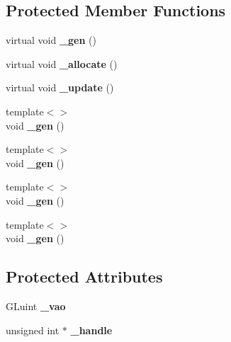 \subsection*{\-Protected \-Member \-Functions}
\begin{DoxyCompactItemize}
\item 
\hypertarget{classs9_1_1gl_1_1Asset_ad03fd53ceb41290c7a90a2c3ab9fab8f}{virtual void {\bfseries \-\_\-gen} ()}\label{classs9_1_1gl_1_1Asset_ad03fd53ceb41290c7a90a2c3ab9fab8f}

\item 
\hypertarget{classs9_1_1gl_1_1Asset_a53948833da532bbd04c75063f631e799}{virtual void {\bfseries \-\_\-allocate} ()}\label{classs9_1_1gl_1_1Asset_a53948833da532bbd04c75063f631e799}

\item 
\hypertarget{classs9_1_1gl_1_1Asset_a4c9866e331f83db5b26342339a26aad5}{virtual void {\bfseries \-\_\-update} ()}\label{classs9_1_1gl_1_1Asset_a4c9866e331f83db5b26342339a26aad5}

\item 
\hypertarget{classs9_1_1gl_1_1Asset_a90e0ab0337352cdd2a2cb5267c7f5b9f}{{\footnotesize template$<$$>$ }\\void {\bfseries \-\_\-gen} ()}\label{classs9_1_1gl_1_1Asset_a90e0ab0337352cdd2a2cb5267c7f5b9f}

\item 
\hypertarget{classs9_1_1gl_1_1Asset_a317ae66dfcf4518582d8c0c219c2e721}{{\footnotesize template$<$$>$ }\\void {\bfseries \-\_\-gen} ()}\label{classs9_1_1gl_1_1Asset_a317ae66dfcf4518582d8c0c219c2e721}

\item 
\hypertarget{classs9_1_1gl_1_1Asset_ab99c6a86c744446056b6c6b14385547b}{{\footnotesize template$<$$>$ }\\void {\bfseries \-\_\-gen} ()}\label{classs9_1_1gl_1_1Asset_ab99c6a86c744446056b6c6b14385547b}

\item 
\hypertarget{classs9_1_1gl_1_1Asset_a484420b3d6bf8f5824f9e2ae5deb2e4c}{{\footnotesize template$<$$>$ }\\void {\bfseries \-\_\-gen} ()}\label{classs9_1_1gl_1_1Asset_a484420b3d6bf8f5824f9e2ae5deb2e4c}

\end{DoxyCompactItemize}
\subsection*{\-Protected \-Attributes}
\begin{DoxyCompactItemize}
\item 
\hypertarget{classs9_1_1gl_1_1Asset_a081a30bb6bb16cfebbee2e76e5447f31}{\-G\-Luint {\bfseries \-\_\-vao}}\label{classs9_1_1gl_1_1Asset_a081a30bb6bb16cfebbee2e76e5447f31}

\item 
\hypertarget{classs9_1_1gl_1_1Asset_abd42fcd8610f1429f0e94ad24b1a9db9}{unsigned int $\ast$ {\bfseries \-\_\-handle}}\label{classs9_1_1gl_1_1Asset_abd42fcd8610f1429f0e94ad24b1a9db9}

\end{DoxyCompactItemize}
